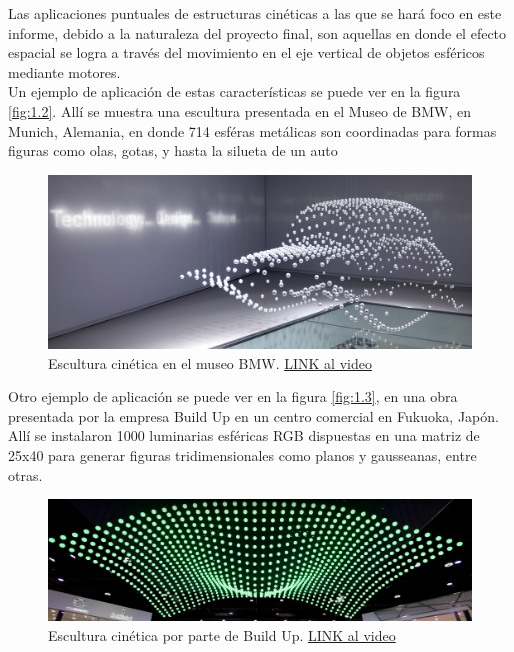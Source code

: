 Las aplicaciones puntuales de estructuras cinéticas a las que se hará foco en este informe, debido a la naturaleza del proyecto final, son aquellas en donde el efecto espacial se logra a través del movimiento en el eje vertical de objetos esféricos mediante motores. \\


Un ejemplo de aplicación de estas características se puede ver en la figura \ref{fig:1.2}. Allí se muestra una escultura presentada en el Museo de BMW, en Munich, Alemania, en donde 714 esféras metálicas son coordinadas para formas figuras como olas, gotas, y hasta la silueta de un auto \\
\begin{figure}[!ht]
	\centering
	\includegraphics[width=15cm,scale=1]{resources/4-kinSculp2.png}
	\caption{ Escultura cinética en el museo BMW. \href{https://www.youtube.com/watch?v=HVhVClFMg6Y}{LINK al video} }
	\label{fig:\thefigure}
\end{figure}

Otro ejemplo de aplicación se puede ver en la figura \ref{fig:1.3}, en una obra presentada por la empresa Build Up en un centro comercial en Fukuoka, Japón. Allí se instalaron 1000 luminarias esféricas RGB dispuestas en una matriz de 25x40 para generar figuras tridimensionales como planos y gausseanas, entre otras. \\
\begin{figure}[!ht]
	\centering
	\includegraphics[width=15cm,scale=1]{resources/4-kinSculp3.png}
	\caption{ Escultura cinética por parte de Build Up. \href{https://www.youtube.com/watch?v=ICixCazf6-k}{LINK al video} }
	\label{fig:\thefigure}
\end{figure}

